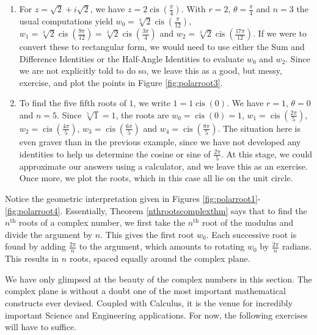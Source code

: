 {\begin{enumerate}
\item  For $z = \sqrt{2} + i \sqrt{2}$, we have $z = 2\operatorname{cis}\left(\frac{\pi}{4}\right)$.  With $r = 2$, $\theta = \frac{\pi}{4}$ and $n =3$ the usual computations yield $w_{0} = \sqrt[3]{2} \operatorname{cis}\left(\frac{\pi}{12}\right)$,  $w_{1} = \sqrt[3]{2} \operatorname{cis}\left(\frac{9\pi}{12}\right) = \sqrt[3]{2} \operatorname{cis}\left(\frac{3\pi}{4}\right) $ and  $w_{2} = \sqrt[3]{2} \operatorname{cis}\left(\frac{17\pi}{12}\right)$.  If we were to  convert these to rectangular form, we would need to use either the Sum and Difference Identities or the Half-Angle Identities to evaluate $w_{0}$ and  $w_{2}$.  Since we are not explicitly told to do so, we leave this as a good, but messy, exercise, and plot the points in Figure \ref{fig:polarroot3}.


\item  To find the five fifth roots of $1$, we write $1 = 1 \operatorname{cis}(0)$.  We have $r = 1$, $\theta = 0$ and $n = 5$. Since $\sqrt[5]{1} = 1$, the roots are  $w_{0} = \operatorname{cis}(0) = 1$, $w_{1} = \operatorname{cis}\left(\frac{2\pi}{5}\right)$, $w_{2} = \operatorname{cis}\left(\frac{4\pi}{5}\right)$, $w_{3} = \operatorname{cis}\left(\frac{6\pi}{5}\right)$ and $w_{4} = \operatorname{cis}\left(\frac{8\pi}{5}\right)$.  The situation here is even graver than in the previous example, since we have not developed any identities to help us determine the cosine or sine of $\frac{2\pi}{5}$.  At this stage, we could approximate our answers using a calculator, and we leave this as an exercise. Once more, we plot the roots, which in this case all lie on the unit circle.


\end{enumerate}
}

\medskip

Notice the geometric interpretation given in Figures \ref{fig:polarroot1}-\ref{fig:polarroot4}.  Essentially,  Theorem \ref{nthrootscomplexthm} says that to find the $n^{\text{th}}$ roots of a complex number,  we first take the $n^{\text{th}}$ root of the modulus and divide the argument by $n$.  This gives the first root  $w_{0}$. Each successive root is found by adding  $\frac{2\pi}{n}$ to the argument, which amounts to rotating $w_{0}$ by $\frac{2\pi}{n}$ radians.  This results in $n$ roots, spaced equally around the complex plane.  

We have only glimpsed at the beauty of the complex numbers in this section.  The complex plane is without a doubt one of the most important mathematical constructs ever devised.  Coupled with Calculus, it is the venue for incredibly important Science and Engineering applications.  For now, the following exercises will have to suffice.

